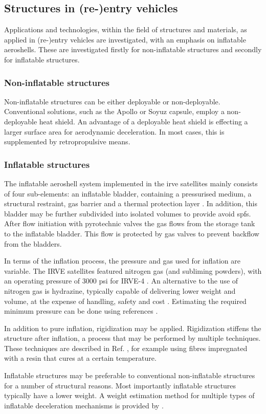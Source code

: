 \subsection{Structures in (re-)entry vehicles}\label{sec:struc}
Applications and technologies, within the field of structures and materials, as applied in (re-)entry vehicles are investigated, with an emphasis on inflatable aeroshells. These are investigated firstly for non-inflatable structures and secondly for inflatable structures.

\subsubsection{Non-inflatable structures}
Non-inflatable structures can be either deployable or non-deployable. Conventional solutions, such as the Apollo or Soyuz capsule, employ a non-deployable heat shield. An advantage of a deployable heat shield is effecting a larger surface area for aerodynamic deceleration. In most cases, this is supplemented by retropropulsive means.



\subsubsection{Inflatable structures}
The inflatable aeroshell system implemented in the \gls{irve} satellites mainly consists of four sub-elements: an inflatable bladder, containing a pressurised medium, a structural restraint, gas barrier and a thermal protection layer \cite{Hughes2005}. In addition, this bladder may be further subdivided into isolated volumes to provide avoid \gls{spfs}. After flow initiation with pyrotechnic valves the gas flows from the storage tank to the inflatable bladder. This flow is protected by gas valves to prevent backflow from the bladders. \cite{Hughes2005} 

In terms of the inflation process, the pressure and gas used for inflation are variable. The IRVE satellites featured nitrogen gas (and subliming powders), with an operating pressure of 3000 psi for IRVE-4 \cite{Litton2011}. An alternative to the use of nitrogen gas is hydrazine, typically capable of delivering lower weight and volume, at the expense of handling, safety and cost \cite{Freeland1998}. Estimating the required minimum pressure can be done using references \cite{Samareh2011, Brown2009}.

In addition to pure inflation, rigidization may be applied. Rigidization stiffens the structure after inflation, a process that may be performed by multiple techniques. These techniques are described in Ref. \cite{Freeland1998,Jenkins2001}, for example using fibres impregnated with a resin that cures at a certain temperature. 






Inflatable structures may be preferable to conventional non-inflatable structures for a number of structural reasons. Most importantly inflatable structures typically have a lower weight. A weight estimation method for multiple types of inflatable deceleration mechanisms is provided by \cite{Samareh2011}.






